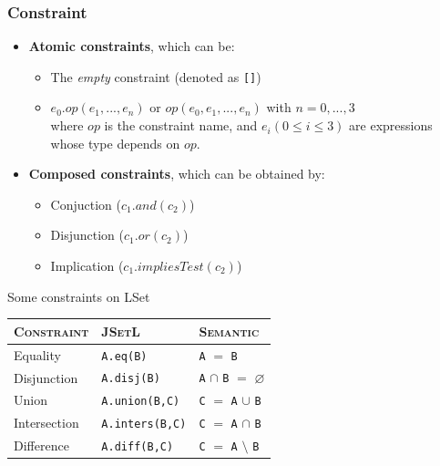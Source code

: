 \documentclass{beamer}
\begin{document}
\begin{frame}[fragile]
\frametitle{Constraint}
\begin{itemize}
\setlength\itemsep{2em}
\item \textbf{Atomic constraints}, which can be:\\
\begin{itemize}
\item The \emph{empty} constraint (denoted as \texttt{[]})\\
\item $ e_{0}.op(e_{1},...,e_{n}) $ or $op(e_{0},e_{1},...,e_{n}) $ with $ n = 0,...,3 $\\
where $op$ is the constraint name, and $e_{i} (0 \le i \le 3)$ are expressions whose type depends on $op$.\\
\end{itemize}
\item \textbf{Composed constraints}, which can be obtained by:
\begin{itemize}
\item Conjuction ($ c_{1}.and(c_{2}) $)
\item Disjunction ($ c_{1}.or(c_{2}) $)
\item Implication ($ c_{1}.impliesTest(c_{2}) $)\\
\end{itemize}
\end{itemize}
\end{frame}

\begin{frame}{Some constraints on LSet}
\begin{table}[]
\begin{tabular}{|l|l|l|}
\hline
\textsc{Constraint}     & \textsc{JSetL}           & \textsc{Semantic}\\ \hline
Equality  	 & \texttt{A.eq(B)}                 & \texttt{A} $=$ \texttt{B}                        \\ \hline
Disjunction  & \texttt{A.disj(B)}           & \texttt{A} $\cap$ \texttt{B} $=$ $\varnothing$   \\ \hline
Union        & \texttt{A.union(B,C)}    & \texttt{C} $=$ \texttt{A} $\cup$ \texttt{B}      \\ \hline
Intersection & \texttt{A.inters(B,C)}  & \texttt{C} $=$ \texttt{A} $\cap$ \texttt{B}      \\ \hline
Difference   & \texttt{A.diff(B,C)}      & \texttt{C} $=$ \texttt{A} $\setminus$ \texttt{B} \\ \hline
\end{tabular}
\end{table}
\end{frame}
\end{document}
